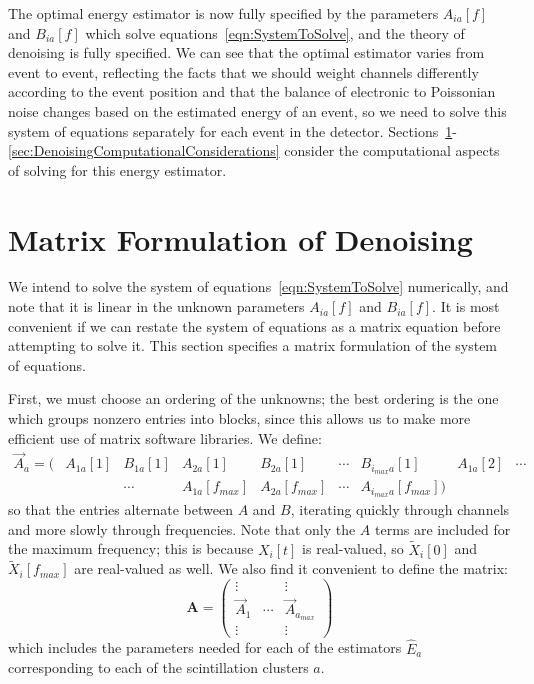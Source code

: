The optimal energy estimator is now fully specified by the parameters $A_{ia}[f]$ and $B_{ia}[f]$ which solve equations~\ref{eqn:SystemToSolve}, and the theory of denoising is fully specified.  We can see that the optimal estimator varies from event to event, reflecting the facts that we should weight channels differently according to the event position and that the balance of electronic to Poissonian noise changes based on the estimated energy of an event, so we need to solve this system of equations separately for each event in the detector.  Sections~\ref{sec:MatrixFormulationOfDenoising}-\ref{sec:DenoisingComputationalConsiderations} consider the computational aspects of solving for this energy estimator.

\section{Matrix Formulation of Denoising}\label{sec:MatrixFormulationOfDenoising}

We intend to solve the system of equations~\ref{eqn:SystemToSolve} numerically, and note that it is linear in the unknown parameters $A_{ia}[f]$ and $B_{ia}[f]$.  It is most convenient if we can restate the system of equations as a matrix equation before attempting to solve it.  This section specifies a matrix formulation of the system of equations.

First, we must choose an ordering of the unknowns; the best ordering is the one which groups nonzero entries into blocks, since this allows us to make more efficient use of matrix software libraries.  We define:
\begin{equation} \begin{matrix}
\vec{A}_a = \bigg( & A_{1 a}[1] & B_{1 a}[1] & A_{2 a}[1] & B_{2 a}[1] & \cdots & B_{i_{max} a}[1] & A_{1 a}[2] & \cdots \\
& & \cdots  & A_{1 a}[f_{max}] & A_{2 a}[f_{max}] & \cdots & A_{i_{max} a}[f_{max}] \bigg)
\end{matrix}\end{equation}
so that the entries alternate between $A$ and $B$, iterating quickly through channels and more slowly through frequencies.  Note that only the $A$ terms are included for the maximum frequency; this is because $X_i[t]$ is real-valued, so $\widetilde{X}_i[0]$ and $\widetilde{X}_i[f_{max}]$ are real-valued as well.  We also find it convenient to define the matrix:
\begin{equation}
\mathbf{A} = \begin{pmatrix}
\vdots & & \vdots \\
\vec{A}_1 & \cdots & \vec{A}_{a_{max}} \\
\vdots & & \vdots
\end{pmatrix}
\end{equation}
which includes the parameters needed for each of the estimators $\widehat{E}_a$ corresponding to each of the scintillation clusters $a$.

